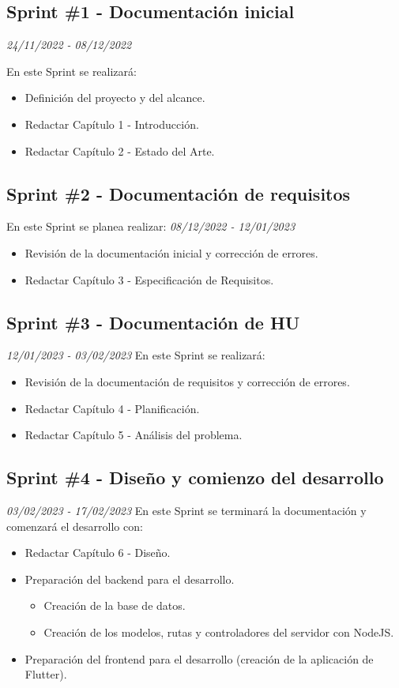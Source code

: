 \subsection{Sprint \#1 - Documentación inicial}
\textit{24/11/2022   -   08/12/2022}

En este Sprint se realizará:
\begin{itemize}

    \item Definición del proyecto y del alcance.
    \item Redactar Capítulo 1 - Introducción.
    \item Redactar Capítulo 2 - Estado del Arte.
\end{itemize}
\subsection{Sprint \#2 - Documentación de requisitos}
En este Sprint se planea realizar:
\textit{08/12/2022   -   12/01/2023}
\begin{itemize}
    \item Revisión de la documentación inicial y corrección de errores.
    \item Redactar Capítulo 3 - Especificación de Requisitos.
\end{itemize}

\subsection{Sprint \#3 - Documentación de HU}
\textit{12/01/2023   -   03/02/2023}
En este Sprint se realizará:
\begin{itemize}
    \item Revisión de la documentación de requisitos y corrección de errores.
    \item Redactar Capítulo 4 - Planificación.
    \item Redactar Capítulo 5 - Análisis del problema.
\end{itemize}
\subsection{Sprint \#4 - Diseño y comienzo del desarrollo}
\textit{03/02/2023   -   17/02/2023}
En este Sprint se terminará la documentación y comenzará el desarrollo con:
\begin{itemize}
    \item Redactar Capítulo 6 - Diseño.
    \item Preparación del backend para el desarrollo.
    \begin{itemize}
        \item Creación de la base de datos.
        \item Creación de los modelos, rutas y controladores del servidor con NodeJS.
    \end{itemize}
    \item Preparación del frontend para el desarrollo (creación de la aplicación de Flutter).
\end{itemize}
